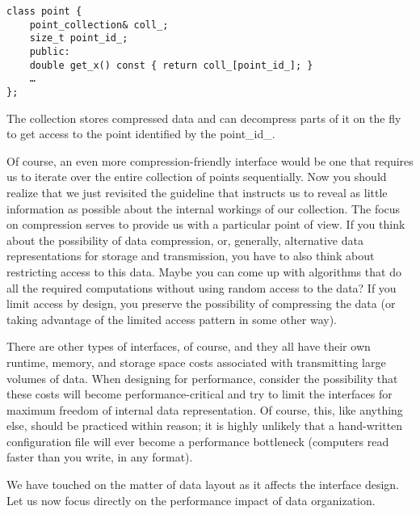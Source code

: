 \begin{lstlisting}[style=styleCXX]
class point {
	point_collection& coll_;
	size_t point_id_;
	public:
	double get_x() const { return coll_[point_id_]; }
	…
};
\end{lstlisting}

The collection stores compressed data and can decompress parts of it on the fly to get access to the point identified by the point\_id\_. 

Of course, an even more compression-friendly interface would be one that requires us to iterate over the entire collection of points sequentially. Now you should realize that we just revisited the guideline that instructs us to reveal as little information as possible about the internal workings of our collection. The focus on compression serves to provide us with a particular point of view. If you think about the possibility of data compression, or, generally, alternative data representations for storage and transmission, you have to also think about restricting access to this data. Maybe you can come up with algorithms that do all the required computations without using random access to the data? If you limit access by design, you preserve the possibility of compressing the data (or taking advantage of the limited access pattern in some other way). 

There are other types of interfaces, of course, and they all have their own runtime, memory, and storage space costs associated with transmitting large volumes of data. When designing for performance, consider the possibility that these costs will become performance-critical and try to limit the interfaces for maximum freedom of internal data representation. Of course, this, like anything else, should be practiced within reason; it is highly unlikely that a hand-written configuration file will ever become a performance bottleneck (computers read faster than you write, in any format). 

We have touched on the matter of data layout as it affects the interface design. Let us now focus directly on the performance impact of data organization.



























